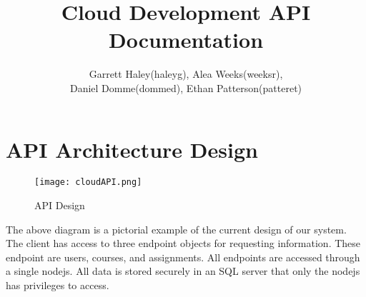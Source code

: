 \documentclass[a4paper]{article}
\title{\textbf{Cloud Development API Documentation}}
\author{Garrett Haley(haleyg), Alea Weeks(weeksr), \\[2mm] Daniel Domme(dommed), Ethan Patterson(patteret)}
\begin{document}
\maketitle
\pagebreak
\tableofcontents
\pagebreak
\section{API Architecture Design}
\begin{figure}[h!]
    \centering
    \texttt{[image: cloudAPI.png]}
    \caption{API Design}
    \label{fig:my_label}
\end{figure}
The above diagram is a pictorial example of the current design of our system. The client has access to three endpoint objects for requesting information. These endpoint are users, courses, and assignments. All endpoints are accessed through a single nodejs. All data is stored securely in an SQL server that only the nodejs has privileges to access.
\\[2mm]
\end{document}
